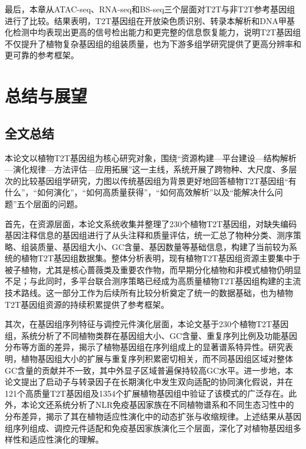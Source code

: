 最后，本章从ATAC-seq、RNA-seq和BS-seq三个层面对T2T与非T2T参考基因组进行了比较。结果表明，T2T基因组在开放染色质识别、转录本解析和DNA甲基化检测中均表现出更高的信号检出能力和更完整的信息恢复能力，说明T2T基因组不仅提升了植物复杂基因组的组装质量，也为下游多组学研究提供了更高分辨率和更可靠的参考框架。

\chapter{总结与展望}

\section{全文总结}

本论文以植物T2T基因组为核心研究对象，围绕“资源构建—平台建设—结构解析—演化规律—方法评估—应用拓展”这一主线，系统开展了跨物种、大尺度、多层次的比较基因组学研究，力图以传统基因组为背景更好地回答植物T2T基因组“有什么”，“如何演化”，“如何高质量获得”，“如何高效解析”以及“能解决什么问题”五个层面的问题。

首先，在资源层面，本论文系统收集并整理了230个植物T2T基因组，对缺失编码基因注释信息的基因组进行了从头注释和质量评估，统一汇总了物种分类、测序策略、组装质量、基因组大小、GC含量、基因数量等基础信息，构建了当前较为系统的植物T2T基因组数据集。整体分析表明，现有植物T2T基因组资源主要集中于被子植物，尤其是核心蔷薇类及重要农作物，而早期分化植物和非模式植物仍明显不足；与此同时，多平台联合测序策略已经成为高质量植物T2T基因组构建的主流技术路线。这一部分工作为后续所有比较分析奠定了统一的数据基础，也为植物T2T基因组资源的持续积累提供了参考框架。

其次，在基因组序列特征与调控元件演化层面，本论文基于230个植物T2T基因组，系统分析了不同植物类群在基因组大小、GC含量、重复序列比例及功能基因分布等方面的差异，揭示了植物基因组在序列组成上的显著谱系特异性。研究表明，植物基因组大小的扩展与重复序列积累密切相关，而不同基因组区域对整体GC含量的贡献并不一致，其中外显子区域普遍保持较高GC水平。进一步地，本论文提出了启动子与转录因子在长期演化中发生双向适配的协同演化假说，并在121个高质量T2T基因组及1354个扩展植物基因组中验证了该模式的广泛存在。此外，本论文还系统分析了NLR免疫基因家族在不同植物谱系和不同生态习性中的分布差异，揭示了其在植物适应性演化中的动态扩张与收缩规律。上述结果从基因组序列组成、调控元件适配和免疫基因家族演化三个层面，深化了对植物基因组多样性和适应性演化的理解。

